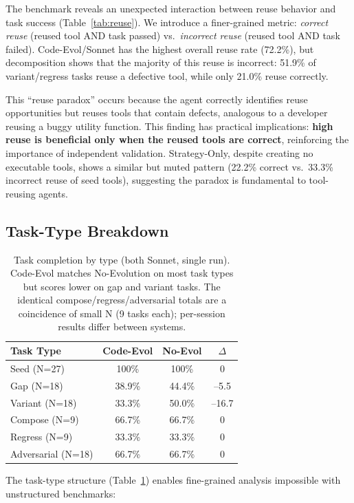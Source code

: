 \documentclass[sigplan,review,anonymous]{acmart}
\begin{document}
The benchmark reveals an unexpected interaction between reuse behavior and task success (Table~\ref{tab:reuse}). We introduce a finer-grained metric: \emph{correct reuse} (reused tool AND task passed) vs.\ \emph{incorrect reuse} (reused tool AND task failed). Code-Evol/Sonnet has the highest overall reuse rate (72.2\%), but decomposition shows that the majority of this reuse is incorrect: 51.9\% of variant/regress tasks reuse a defective tool, while only 21.0\% reuse correctly.

This ``reuse paradox'' occurs because the agent correctly identifies reuse opportunities but reuses tools that contain defects, analogous to a developer reusing a buggy utility function. This finding has practical implications: \textbf{high reuse is beneficial only when the reused tools are correct}, reinforcing the importance of independent validation. Strategy-Only, despite creating no executable tools, shows a similar but muted pattern (22.2\% correct vs.\ 33.3\% incorrect reuse of seed tools), suggesting the paradox is fundamental to tool-reusing agents.

\subsection{Task-Type Breakdown}

\begin{table}[t]
\centering
\footnotesize
\begin{tabular}{lccc}
\toprule
\textbf{Task Type} & \textbf{Code-Evol} & \textbf{No-Evol} & $\Delta$ \\
\midrule
Seed (N=27) & 100\% & 100\% & 0 \\
Gap (N=18) & 38.9\% & 44.4\% & --5.5 \\
Variant (N=18) & 33.3\% & 50.0\% & --16.7 \\
Compose (N=9) & 66.7\% & 66.7\% & 0 \\
Regress (N=9) & 33.3\% & 33.3\% & 0 \\
Adversarial (N=18) & 66.7\% & 66.7\% & 0 \\
\bottomrule
\end{tabular}
\caption{Task completion by type (both Sonnet, single run). Code-Evol matches No-Evolution on most task types but scores lower on gap and variant tasks. The identical compose/regress/adversarial totals are a coincidence of small N (9 tasks each); per-session results differ between systems.}
\label{tab:task_type}
\end{table}

The task-type structure (Table~\ref{tab:task_type}) enables fine-grained analysis impossible with unstructured benchmarks:
\end{document}
